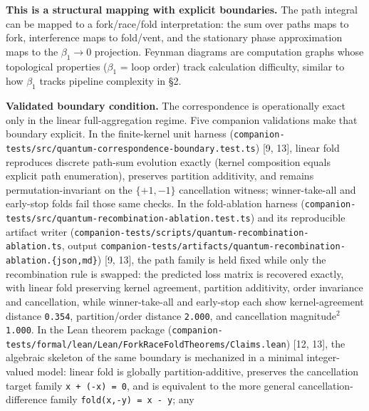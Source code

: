 \documentclass[
  11pt,
]{article}
\begin{document}
\textbf{This is a structural mapping with explicit boundaries.} The path
integral can be mapped to a fork/race/fold interpretation: the sum over
paths maps to fork, interference maps to fold/vent, and the stationary
phase approximation maps to the \(\beta_1 \to 0\) projection. Feynman
diagrams are computation graphs whose topological properties
(\(\beta_1\) = loop order) track calculation difficulty, similar to how
\(\beta_1\) tracks pipeline complexity in §2.

\textbf{Validated boundary condition.} The correspondence is
operationally exact only in the linear full-aggregation regime. Five
companion validations make that boundary explicit. In the finite-kernel
unit harness
(\texttt{companion-\allowbreak{}tests/\allowbreak{}src/\allowbreak{}quantum-\allowbreak{}correspondence-\allowbreak{}boundary.\allowbreak{}test.\allowbreak{}ts})
{[}9, 13{]}, linear fold reproduces discrete path-sum evolution exactly
(kernel composition equals explicit path enumeration), preserves
partition additivity, and remains permutation-invariant on the
\(\{+1,-1\}\) cancellation witness; winner-take-all and early-stop folds
fail those same checks. In the fold-ablation harness
(\texttt{companion-\allowbreak{}tests/\allowbreak{}src/\allowbreak{}quantum-\allowbreak{}recombination-\allowbreak{}ablation.\allowbreak{}test.\allowbreak{}ts})
and its reproducible artifact writer
(\texttt{companion-\allowbreak{}tests/\allowbreak{}scripts/\allowbreak{}quantum-\allowbreak{}recombination-\allowbreak{}ablation.\allowbreak{}ts},
output
\texttt{companion-\allowbreak{}tests/\allowbreak{}artifacts/\allowbreak{}quantum-\allowbreak{}recombination-\allowbreak{}ablation.\allowbreak{}\{json,md\}})
{[}9, 13{]}, the path family is held fixed while only the recombination
rule is swapped: the predicted loss matrix is recovered exactly, with
linear fold preserving kernel agreement, partition additivity, order
invariance and cancellation, while winner-take-all and early-stop each
show kernel-agreement distance \texttt{0.354}, partition/order distance
\texttt{2.000}, and cancellation magnitude\(^2\) \texttt{1.000}. In the
Lean theorem package
(\texttt{companion-\allowbreak{}tests/\allowbreak{}formal/\allowbreak{}lean/\allowbreak{}Lean/\allowbreak{}ForkRaceFoldTheorems/\allowbreak{}Claims.\allowbreak{}lean})
{[}12, 13{]}, the algebraic skeleton of the same boundary is mechanized
in a minimal integer-valued model: linear fold is globally
partition-additive, preserves the cancellation target family
\texttt{x\ +\ (-x)\ =\ 0}, and is equivalent to the more general
cancellation-difference family \texttt{fold(x,-y)\ =\ x\ -\ y}; any
\end{document}
